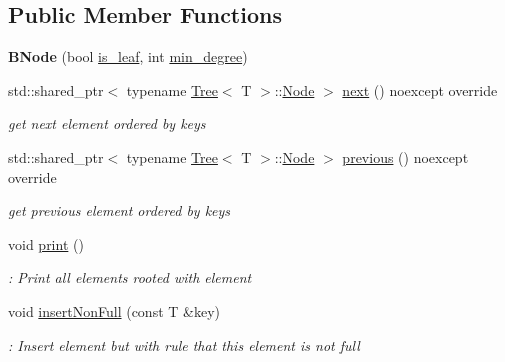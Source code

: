 \subsection*{Public Member Functions}
\begin{DoxyCompactItemize}
\item 
\mbox{\label{classBTree_1_1BNode_a6db3bbcf350e06109f86db08f86fc1d2}} 
{\bfseries B\+Node} (bool \hyperlink{classBTree_1_1BNode_aeea14a23dfc45f162ecbbc736b24014a}{is\+\_\+leaf}, int \hyperlink{classBTree_1_1BNode_a9a108839cbc75c2c207d97140577bd7c}{min\+\_\+degree})
\item 
std\+::shared\+\_\+ptr$<$ typename \hyperlink{classTree}{Tree}$<$ T $>$\+::\hyperlink{classTree_1_1Node}{Node} $>$ \hyperlink{classBTree_1_1BNode_a8440e89eab5284dc118c00de4e7e619b}{next} () noexcept override
\begin{DoxyCompactList}\small\item\em get next element ordered by keys \end{DoxyCompactList}\item 
std\+::shared\+\_\+ptr$<$ typename \hyperlink{classTree}{Tree}$<$ T $>$\+::\hyperlink{classTree_1_1Node}{Node} $>$ \hyperlink{classBTree_1_1BNode_aa3909dab0e45cf56b602705b8720e7c0}{previous} () noexcept override
\begin{DoxyCompactList}\small\item\em get previous element ordered by keys \end{DoxyCompactList}\item 
\mbox{\label{classBTree_1_1BNode_a8501fb870aca2959c7636bb0ca96424f}} 
void \hyperlink{classBTree_1_1BNode_a8501fb870aca2959c7636bb0ca96424f}{print} ()
\begin{DoxyCompactList}\small\item\em \+: Print all elements rooted with element \end{DoxyCompactList}\item 
\mbox{\label{classBTree_1_1BNode_a12209859c0d20881dc4197e9c677dfd5}} 
void \hyperlink{classBTree_1_1BNode_a12209859c0d20881dc4197e9c677dfd5}{insert\+Non\+Full} (const T \&key)
\begin{DoxyCompactList}\small\item\em \+: Insert element but with rule that this element is not full \end{DoxyCompactList}\item 

\end{DoxyCompactItemize}
